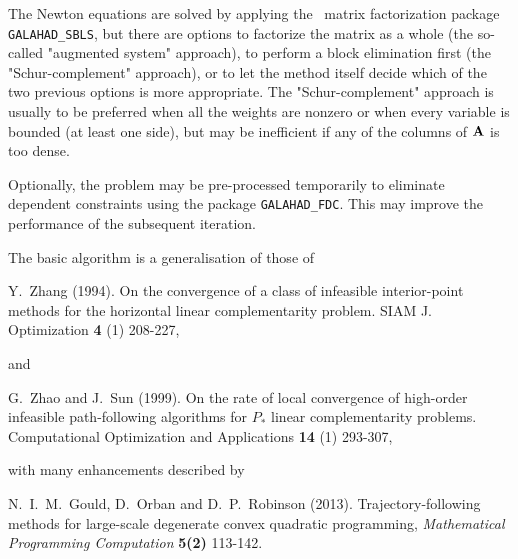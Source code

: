 \documentclass{galahad}
\begin{document}
The Newton equations are solved  by applying the
\galahad\ matrix factorization package
{\tt GALAHAD\_SBLS}, but there are options
to factorize the matrix as a whole (the so-called "augmented system"
approach), to perform a block elimination first (the "Schur-complement"
approach), or to let the method itself decide which of the two
previous options is more appropriate.
The "Schur-complement" approach is usually to be preferred when all the
weights are nonzero or when every variable is bounded (at least one side),
but may be inefficient if any of the columns of ${\mathbf{A}}$ is too dense.

Optionally, the problem may be pre-processed temporarily to eliminate dependent
constraints using the package {\tt GALAHAD\_FDC}. This may improve the
performance of the subsequent iteration.

\vspace*{1mm}

\galreferences
\vspace*{1mm}

\noindent
The basic algorithm is a generalisation of those of
\vspace*{1mm}

\noindent
Y.\ Zhang (1994).
On the convergence of a class of infeasible interior-point methods for the
horizontal linear complementarity problem.
SIAM J. Optimization {\bf 4} (1) 208-227,
\vspace*{1mm}

\noindent
and

\noindent
G.\ Zhao and J.\ Sun (1999).
On the rate of local convergence of high-order
infeasible path-following algorithms for $P_*$ linear complementarity
problems.
Computational Optimization and Applications {\bf 14} (1) 293-307,
\vspace*{1mm}

\noindent
with many enhancements described by
\vspace*{1mm}

\noindent
N.\ I.\ M.\ Gould, D.\ Orban and D.\ P.\ Robinson (2013).
Trajectory-following methods for
large-scale  degenerate convex quadratic programming,
{\em Mathematical Programming Computation} {\bf 5(2)} 113-142.

\end{document}
